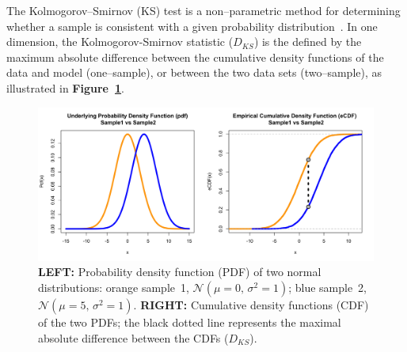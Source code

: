 \documentclass[codesnippet]{jss}
\begin{document}
The Kolmogorov--Smirnov (KS) test is a non--parametric method for
determining whether a sample is consistent with a given probability
distribution~\citep{Stephens1992a}.
%
%
%
%
In one dimension, the Kolmogorov-Smirnov statistic ($D_{KS}$) is the
defined by the maximum absolute difference between the cumulative
density functions of the data and model (one--sample), or between the
two data sets (two--sample), as illustrated in
\textbf{Figure~\ref{fig:kstest1D}}.

\begin{figure}[hbt]
\centering
\includegraphics{pdfvsCDF}
\caption{\label{fig:kstest1D} \textbf{LEFT:} Probability density function (PDF) of two normal distributions: orange sample~1, $\mathcal{N}(\mu = 0,\,\sigma^{2} = 1)$; blue sample~2, $\mathcal{N}(\mu = 5,\,\sigma^{2} = 1)$. \textbf{RIGHT:} Cumulative density functions (CDF) of the two PDFs; the black dotted line represents the maximal absolute difference between the CDFs ($D_{KS}$).
}
\end{figure}
\end{document}
